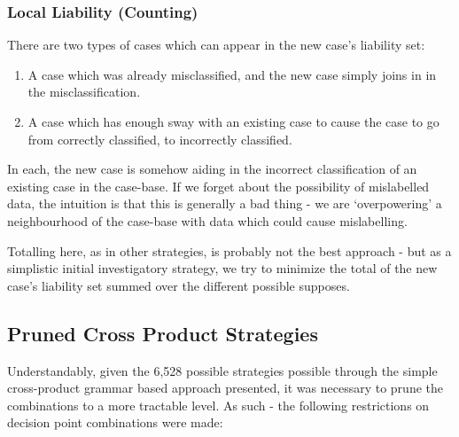 \documentclass[a4paper,11pt]{report}
\begin{document}
\subsubsection{Local Liability (Counting)}
There are two types of cases which can appear in the new case's liability set:
\begin{enumerate}
	\item A case which was already misclassified, and the new case simply joins in in the misclassification.
	\item A case which has enough sway with an existing case to cause the case to go from correctly classified, to incorrectly classified.
\end{enumerate}

In each, the new case is somehow aiding in the incorrect classification of an existing case in the case-base. If we forget about the possibility of mislabelled data, the intuition is that this is generally a bad thing - we are `overpowering' a neighbourhood of the case-base with data which could cause mislabelling.

Totalling here, as in other strategies, is probably not the best approach - but as a simplistic initial investigatory strategy, we try to minimize the total of the new case's liability set summed over the different possible supposes.

\subsection{Pruned Cross Product Strategies}
Understandably, given the 6,528 possible strategies possible through the simple cross-product grammar based approach presented, it was necessary to prune the combinations to a more tractable level. As such - the following restrictions on decision point combinations were made:
\end{document}

